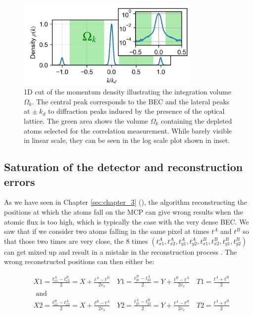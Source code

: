 \begin{figure}
    \centering
    \includegraphics[width=0.8\textwidth]{Fig/Chapter4/densite.png}
    \caption{1D cut of the momentum density illustrating the integration volume $\Omega_k$. The central peak corresponds to the BEC and the lateral peaks at $\pm \ k_d$ to diffraction peaks induced by the presence of the optical lattice. The green area shows the volume $\Omega_k$ containing the depleted atoms selected for the correlation measurement. While barely visible in linear scale, they can be seen in the log scale plot shown in inset.}
    \label{fig:omega_k}
\end{figure}

\subsection{Saturation of the detector and reconstruction errors}

As we have seen in Chapter \ref{sec:chapter_3} (), the algorithm reconstructing the positions at which the atoms fall on the MCP can give wrong results when the atomic flux is too high, which is typically the case with the very dense BEC. We saw that if we consider two atoms falling in the same pixel at times $t^A$ and  $t^B$ so that those two times are very close, the 8 times $(t_{x 1}^{A}, t_{x 2}^{A}, t_{y 1}^{A}, t_{y 2}^{A}, t_{x 1}^{B}, t_{x 2}^{B}, t_{y 1}^{B}, t_{y 2}^{B})$ can get mixed up and result in a mistake in the reconstruction process \cite{cayla_these}. The wrong reconstructed positions can then either be:

\begin{equation}
\begin{aligned}
&X 1=\frac{t_{x 1}^{A}-t_{x 2}^{B}}{2}=X+\frac{t^{A}-t^{B}}{2 v_{x}} \quad Y 1=\frac{t_{y 1}^{B}-t_{y 2}^{A}}{2}=Y+\frac{t^{B}-t^{A}}{2 v_{x}} \quad T 1=\frac{t^{A}+t^{B}}{2}\\
&\text { and }\\
&X 2=\frac{t_{x 1}^{B}-t_{x 2}^{A}}{2}=X+\frac{t^{B}-t^{A}}{2 v_{x}} \quad Y 2=\frac{t_{y 1}^{A}-t_{y 2}^{B}}{2}=Y+\frac{t^{A}-t^{B}}{2 v_{x}} \quad T 2=\frac{t^{A}+t^{B}}{2}
\end{aligned}
\end{equation}

